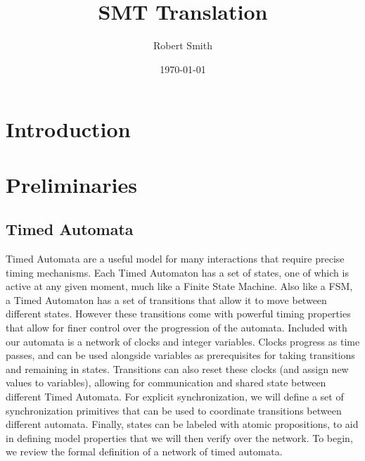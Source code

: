 \documentclass[a4paper,12pt]{article}
\author{Robert Smith}
\date{\today}
\title{SMT Translation}
\begin{document}
\maketitle
\tableofcontents

\section{Introduction}\label{introduction}
\iffalse
Timed Automata are a commonly used representation for modeling the behavior of
systems with real-time semantics.


Current examples of TA bounded model checkers include XX, YY, and de facto
standard Uppaal. TACK is a tool focused on allowing for the expression of TA
properties in Metric Interval Temporal Logic, a rich \ldots{}

TACK translates both the TA and the property to be verified into CLTLoc.
Constraint Linear Temporal Logic (over clocks) is a variant of

Zot

Sbvzot is a very successful solver which takes advantage of bit vector logic\ldots{}

To further improve the performance of TACK, we wish to directly translate the
network of timed automata into the SMT-LIB format, skipping the intermediate
CLTLoc representation. While CLTLoc is an elegant expressive language, there is
a significant overhead in
\fi
\section{Preliminaries}\label{prelims}
\subsection{Timed Automata}\label{timed-automata}

Timed Automata are a useful model for many interactions that require precise
timing mechanisms. Each Timed Automaton has a set of states, one of which is
active at any given moment, much like a Finite State Machine. Also like a FSM, a
Timed Automaton has a set of transitions that allow it to move between different
states. However these transitions come with powerful timing properties that
allow for finer control over the progression of the automata. Included with our
automata is a network of clocks and integer variables. Clocks progress as time
passes, and can be used alongside variables as prerequisites for taking
transitions and remaining in states. Transitions can also reset these clocks
(and assign new values to variables), allowing for communication and shared
state between different Timed Automata. For explicit synchronization, we will
define a set of synchronization primitives that can be used to coordinate
transitions between different automata. Finally, states can be labeled with
atomic propositions, to aid in defining model properties that we will then
verify over the network. To begin, we review the formal definition of a network
of timed automata.
\end{document}
